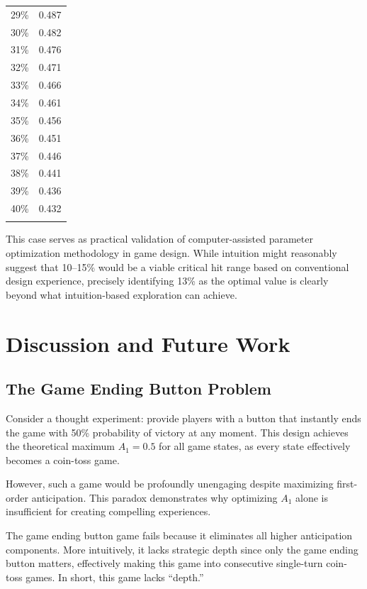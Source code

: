 \documentclass[manuscript,review,anonymous]{acmart}
\theoremstyle{definition}
\theoremstyle{plain}
\begin{document}
\begin{table}
\begin{minipage}[t]{0.45\columnwidth}
\begin{tabular}{cc}
      29\% & 0.487 \\
      30\% & 0.482 \\
      31\% & 0.476 \\
      32\% & 0.471 \\
      33\% & 0.466 \\
      34\% & 0.461 \\
      35\% & 0.456 \\
      36\% & 0.451 \\
      37\% & 0.446 \\
      38\% & 0.441 \\
      39\% & 0.436 \\
      40\% & 0.432 \\
      & \\
      \bottomrule
    \end{tabular}
  \end{minipage}
\end{table}

This case serves as practical validation of computer-assisted parameter optimization methodology in game design.
While intuition might reasonably suggest that 10--15\% would be a viable critical hit range based on conventional design experience, precisely identifying 13\% as the optimal value is clearly beyond what intuition-based exploration can achieve.

\section{Discussion and Future Work}
\subsection{The Game Ending Button Problem}
Consider a thought experiment: provide players with a button that instantly ends the game with 50\% probability of victory at any moment.
This design achieves the theoretical maximum $A_1 = 0.5$ for all game states, as every state effectively becomes a coin-toss game.

However, such a game would be profoundly unengaging despite maximizing first-order anticipation.
This paradox demonstrates why optimizing $A_1$ alone is insufficient for creating compelling experiences.

The game ending button game fails because it eliminates all higher anticipation components.
More intuitively, it lacks strategic depth since only the game ending button matters, effectively making this game into consecutive single-turn coin-toss games.
In short, this game lacks ``depth.''
\end{document}
